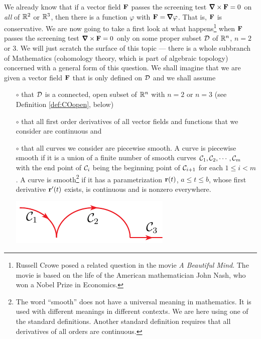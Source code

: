 We already know that if a vector field $\mathbf{F}$ passes the screening
test $\vnabla\times\vF=0$ on \emph{all} of $\mathbb{R}^2$ or $\mathbb{R}^3$,
then there is a function $\varphi$ with $\vF=\vnabla\varphi$.
That is, $\mathbf{F}$ is conservative.  We are now going to take a first look
at what happens\footnote{Russell Crowe posed a related question in the movie
\emph{A Beautiful Mind}. The movie is based on the life of the American mathematician John Nash, who won a Nobel Prize in Economics.}
 when $\mathbf{F}$ passes the screening test $\vnabla\times\vF=0$ 
only on some proper subset $\mathcal{D}$ of $\mathbb{R}^n$, $n=2$ or $3$. 
We will just scratch the surface of this topic --- there is a whole subbranch
of Mathematics (cohomology theory, which is part of algebraic topology) 
concerned with a general form of this question. 
We shall imagine that we are given a vector field $\mathbf{F}$ that is only 
defined on $\mathcal{D}$ and we shall assume
\begin{itemize}\itemsep1pt \parskip0pt  %
\item[$\circ$]
that $\mathcal{D}$ is a connected, open subset of $\mathbb{R}^n$ with $n=2$ or $n=3$
(see Definition \ref{def:COopen}, below)
\item[$\circ$]
that all first order derivatives of all vector fields
and functions that we consider are continuous and
\item[$\circ$] 
that all curves we consider are piecewise smooth. A curve
is piecewise smooth if it 
is a union of a finite number of smooth curves 
$\mathcal{C}_1,\mathcal{C}_2,\cdots,\mathcal{C}_m$ with the end
point of $\mathcal{C}_i$ being the beginning point of $\mathcal{C}_{i+1}$ 
for each $1\le i<m$. A curve is smooth\footnote{The word ``smooth'' does 
not have a universal meaning in mathematics. It is used with different meanings in different contexts. We are here using one of 
the standard definitions. Another standard definition requires that 
all derivatives of all orders are continuous.} if it has a 
parametrization $\mathbf{r}(t)$, $a\le t\le b$, whose first 
derivative $\mathbf{r}'(t)$ exists, is continuous and is 
nonzero everywhere.
\begin{nfig}
\begin{center}
    \includegraphics{pSmooth.pdf}
\end{center}
\end{nfig}
\end{itemize}

